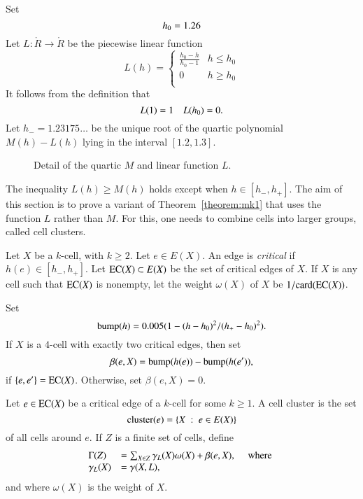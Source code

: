 \begin{definition}
Set
$$
  h_0 = 1.26\\  %
$$
Let $L:\ring{R}\to\ring{R}$ be the piecewise linear function 
$$
L(h) = \begin{cases}
\frac{h_0-h}{h_0-1} & h \le h_0 \\
0 & h\ge h_0 \\
\end{cases}
$$
It follows from the definition that
$$
L(1) = 1\quad L({h_0}) = 0.
$$
Let $h_- = 1.23175\ldots$ be the unique root of the quartic polynomial
$M(h)-L(h)$ lying in the interval $[1.2,1.3]$.
\end{definition}

\begin{figure}[htb]
  \centering
  \caption{Detail of the quartic $M$ and linear function $L$.}
  \label{fig:L}
\end{figure}

The inequality $L(h)\ge M(h)$ holds except when $h\in [h_-,h_+]$.  The aim of this section is to prove a variant of Theorem~\ref{theorem:mk1} that uses the function $L$ rather than $M$.  For this, one needs to combine cells into larger groups, called cell clusters.

\begin{definition}
Let $X$ be a $k$-cell, with $k\ge 2$.  Let $e\in E(X)$.
An edge is {\it critical} if $h(e)\in[h_-,h_+]$.
Let ${\operatorname{EC}}(X)\subset E(X)$ be the set of critical edges of $X$.  If $X$ is any cell such that ${\operatorname{EC}}(X)$ is nonempty, let the weight $\omega(X)$ of $X$  
be $1/{\operatorname{card}}({\operatorname{EC}}(X))$.
\end{definition}

\begin{definition}[$\beta$]  Set 
$$
{\operatorname{bump}}(h) = 0.005 (1 - (h-h_0)^2/(h_+-h_0)^2).
$$
If $X$ is a $4$-cell with exactly two critical edges, then set
$$
\beta(e,X) = {\operatorname{bump}}(h(e)) - {\operatorname{bump}}(h(e')),
$$
if $\{e,e'\} = {\operatorname{EC}}(X)$.  Otherwise, set $\beta(e,X) = 0$.
\end{definition}

\begin{definition}
Let $e\in {\operatorname{EC}}(X)$ be a critical edge of a $k$-cell for some $k\ge 1$.
A cell cluster is the set 
$$
{\operatorname{cluster}}(e) = \{X\ :\  e\in E(X)\} 
$$
of all cells around $e$. 
If $Z$ is a finite set of cells, define
$$
\begin{array}{lll}
\Gamma(Z) &= \sum_{X\in Z} \gamma_L(X) \omega(X) +\beta(e,X),\quad\hbox{ where }\\
\gamma_L(X) &= \gamma(X,L),
\end{array}
$$
and where $\omega(X)$ is the weight of $X$.

\end{definition}


